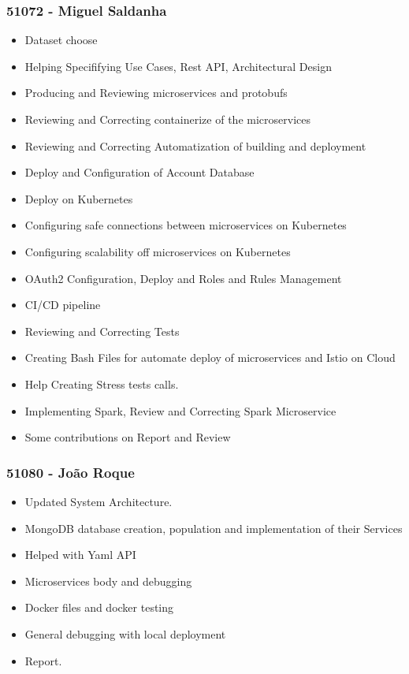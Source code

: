 \documentclass[oneside]{article}
\begin{document}
    \subsubsection{51072 - Miguel Saldanha}
      \begin{itemize}
		\item Dataset choose
		\item Helping Specififying Use Cases, Rest API, Architectural Design
		\item Producing and Reviewing microservices and protobufs
		\item Reviewing and Correcting containerize of the microservices
		\item Reviewing and Correcting Automatization of building and deployment
		\item Deploy and Configuration of Account Database
		\item Deploy on Kubernetes
		\item Configuring safe connections between microservices on Kubernetes
		\item Configuring scalability off microservices on Kubernetes
		\item OAuth2 Configuration, Deploy and Roles and Rules Management
		\item CI/CD pipeline
		\item Reviewing and Correcting Tests
		\item Creating Bash Files for automate deploy of microservices and Istio on Cloud
		\item Help Creating Stress tests calls.
		\item Implementing Spark, Review and Correcting Spark Microservice
		\item Some contributions on Report and Review
      \end{itemize}
    \subsubsection{51080 - João Roque}
      \begin{itemize}
        \item Updated System Architecture.
        \item MongoDB database creation, population and implementation of their Services
        \item Helped with Yaml API
        \item Microservices body and debugging
        \item Docker files and docker testing
        \item General debugging with local deployment
        \item Report.
      \end{itemize}
\end{document}

